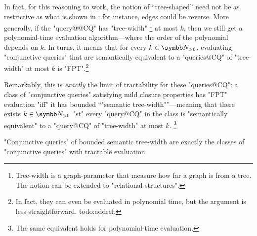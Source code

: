 In fact, for this reasoning to work, the notion of ``tree-shaped'' need not
be as restrictive as what is shown in : for instance,
edges could be reverse. More generally, if the "query@@CQ" has "tree-width"%
\footnote{Tree-width is a graph-parameter that measure how far a graph is from a tree.
The notion can be extended to "relational structures".}
at most $k$, then we still get a polynomial-time evaluation algorithm---where the order
of the polynomial depends on $k$. In turns, it means that for every $k\in\Np$,
evaluating "conjunctive queries" that are semantically equivalent to
a "queries@CQ" of "tree-width" at most $k$ is "FPT".\footnote{In fact,
they can even be evaluated in polynomial time, but the argument is less straightforward.
todo:addref.}

Remarkably, this is \emph{exactly} the limit of tractability for these "queries@CQ":
a class of "conjunctive queries"
satisfying mild closure properties has "FPT" evaluation "iff"
it has bounded ``"semantic tree-width"''---meaning that there exists $k\in\Np$ "st"
every "query@CQ" in the class is "semantically equivalent" to a "query@CQ" 
of "tree-width" at most $k$.%
\footnote{The same equivalent holds for polynomial-time evaluation.}

\begin{known}
	"Conjunctive queries" of bounded semantic tree-width are exactly
	the classes of "conjunctive queries" with tractable evaluation.
\end{known}


